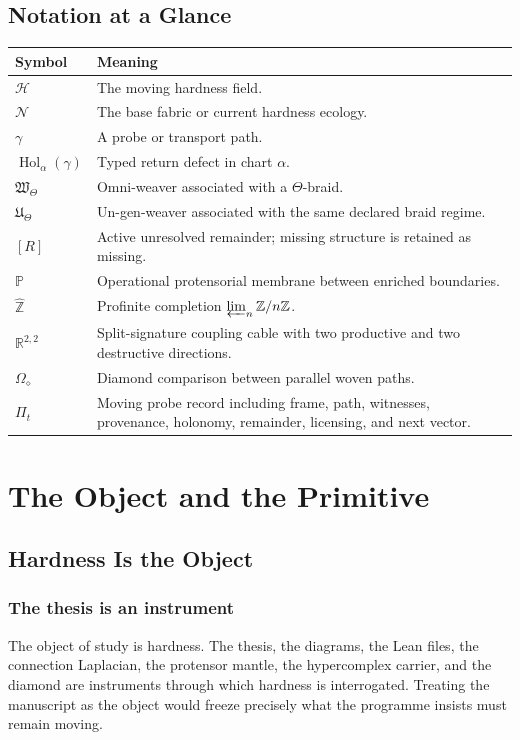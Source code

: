 \documentclass[12pt,openany]{book}
\theoremstyle{remark}
\DeclareMathOperator{\Hol}{Hol}
\newcommand{\Nfabric}{\mathcal N}
\newcommand{\Remainder}{[R]}
\newcommand{\WTheta}{\mathfrak W_{\Theta}}
\newcommand{\UTheta}{\mathfrak U_{\Theta}}
\newcommand{\Hard}{\mathcal H}
\newcommand{\Protensor}{\mathbb P}
\newcommand{\DiamondHol}{\Omega_{\diamond}}
\newcommand{\wideZ}{\widehat{\mathbb Z}}
\begin{document}
\tableofcontents
\listoffigures

\chapter*{Notation at a Glance}
\begin{longtable}{>{\raggedright\arraybackslash}p{}>{\raggedright\arraybackslash}p{}}
\toprule
Symbol & Meaning \\
\midrule
\endhead
$\Hard$ & The moving hardness field. \\
$\Nfabric$ & The base fabric or current hardness ecology. \\
$\gamma$ & A probe or transport path. \\
$\Hol_\alpha(\gamma)$ & Typed return defect in chart $\alpha$. \\
$\WTheta$ & Omni-weaver associated with a $\Theta$-braid. \\
$\UTheta$ & Un-gen-weaver associated with the same declared braid regime. \\
$\Remainder$ & Active unresolved remainder; missing structure is retained as missing. \\
$\Protensor$ & Operational protensorial membrane between enriched boundaries. \\
$\wideZ$ & Profinite completion $\varprojlim_n \mathbb Z/n\mathbb Z$. \\
$\mathbb R^{2,2}$ & Split-signature coupling cable with two productive and two destructive directions. \\
$\DiamondHol$ & Diamond comparison between parallel woven paths. \\
$\Pi_t$ & Moving probe record including frame, path, witnesses, provenance, holonomy, remainder, licensing, and next vector. \\
\bottomrule
\end{longtable}

\clearpage
{}
\part{The Object and the Primitive}

\chapter{Hardness Is the Object}
\label{ch:hardness-object}

\section{The thesis is an instrument}
The object of study is hardness. The thesis, the diagrams, the Lean files, the connection Laplacian, the protensor mantle, the hypercomplex carrier, and the diamond are instruments through which hardness is interrogated. Treating the manuscript as the object would freeze precisely what the programme insists must remain moving.
\end{document}
